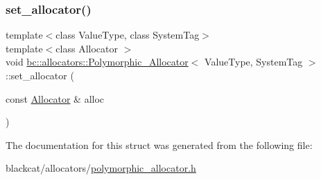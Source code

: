 \mbox{\label{structbc_1_1allocators_1_1Polymorphic__Allocator_adfaa9129bea6203c411df03cd959fe3f}} 
\subsubsection{\texorpdfstring{set\+\_\+allocator()}{set\_allocator()}}
{\footnotesize\ttfamily template$<$class Value\+Type, class System\+Tag$>$ \\
template$<$class Allocator $>$ \\
void \hyperlink{structbc_1_1allocators_1_1Polymorphic__Allocator}{bc\+::allocators\+::\+Polymorphic\+\_\+\+Allocator}$<$ Value\+Type, System\+Tag $>$\+::set\+\_\+allocator (\begin{DoxyParamCaption}\item[{const \hyperlink{classbc_1_1allocators_1_1Allocator}{Allocator} \&}]{alloc }\end{DoxyParamCaption})\hspace{0.3cm}{\ttfamily [inline]}}



The documentation for this struct was generated from the following file\+:\begin{DoxyCompactItemize}
\item 
blackcat/allocators/\hyperlink{polymorphic__allocator_8h}{polymorphic\+\_\+allocator.\+h}\end{DoxyCompactItemize}
